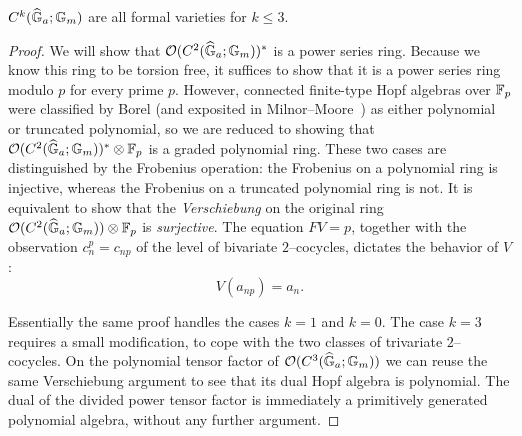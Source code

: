 \begin{lemma}\label{CkGaGmAreFVars}
$C^k(\widehat{\mathbb G}_a; \mathbb G_m)$ are all formal varieties for $k \le 3$.
\end{lemma}
\begin{proof}
We will show that $\mathcal{O}(C^2(\widehat{\mathbb G}_a; \mathbb G_m))^*$ is a power series ring.  Because we know this ring to be torsion free, it suffices to show that it is a power series ring modulo $p$ for every prime $p$.  However, connected finite-type Hopf algebras over $\mathbb F_p$ were classified by Borel (and exposited in Milnor--Moore~\cite[Theorem 7.11]{MilnorMoore}) as either polynomial or truncated polynomial, so we are reduced to showing that $\mathcal{O}(C^2(\widehat{\mathbb G}_a; \mathbb G_m))^* \otimes \mathbb F_p$ is a graded polynomial ring.  These two cases are distinguished by the Frobenius operation: the Frobenius on a polynomial ring is injective, whereas the Frobenius on a truncated polynomial ring is not.  It is equivalent to show that the \emph{Verschiebung} on the original ring $\mathcal{O}(C^2(\widehat{\mathbb G}_a; \mathbb G_m)) \otimes \mathbb F_p$ is \emph{surjective}.  The equation $FV = p$, together with the observation $c_n^p = c_{np}$ of the level of bivariate $2$--cocycles, dictates the behavior of $V$: \[V(a_{np}) = a_n.\]

Essentially the same proof handles the cases $k = 1$ and $k = 0$.  The case $k = 3$ requires a small modification, to cope with the two classes of trivariate $2$--cocycles.  On the polynomial tensor factor of $\mathcal{O}(C^3(\widehat{\mathbb G}_a; \mathbb G_m))$ we can reuse the same Verschiebung argument to see that its dual Hopf algebra is polynomial.  The dual of the divided power tensor factor is immediately a primitively generated polynomial algebra, without any further argument.
\end{proof}

